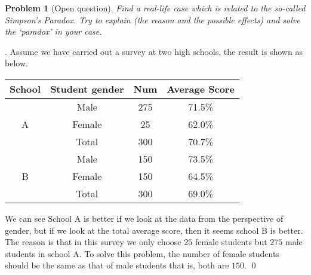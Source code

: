 \documentclass[12pt]{article}
\newtheorem{hw}{Problem}
\newenvironment{sol}
  {\par\vspace{3mm}\noindent{\it Solution}.}
  {\qed}
\begin{document}
\begin{hw}[Open question]
Find a real-life case which is related to the so-called \emph{Simpson's Paradox}.  Try to explain (the reason and the possible effects) and solve the `paradox' in your case.
\end{hw}
\begin{sol}
	Assume we have carried out a survey at two high schools, the result is shown as below.
	\begin{table}[h]
		\footnotesize
		\centering
		\label{Res}
		\renewcommand\arraystretch{1.1}
		\begin{tabular}{cccc}
			
			\hline
			\textbf{School} & \textbf{Student gender} & \textbf{Num} & \textbf{Average Score}\\ \hline
			  & Male & 275  & 71.5\% \\
			A & Female   & 25   & 62.0\% \\
			  & Total              & 300  & 70.7\% \\
			\hline
			  & Male & 150  & 73.5\% \\
			B & Female    & 150   & 64.5\% \\
			  & Total              & 300  & 69.0\% \\
			 \hline
		\end{tabular}
	\end{table}
	We can see School A is better if we look at the data from the perspective of gender, but if we look at the total average score, then it seems school B is better. The reason is that in this survey we only choose $25$ female students but $275$ male students in school A. To solve this problem, the number of female students should be the same as that of male students that is, both are $150$.
\end{sol}
\end{document}
